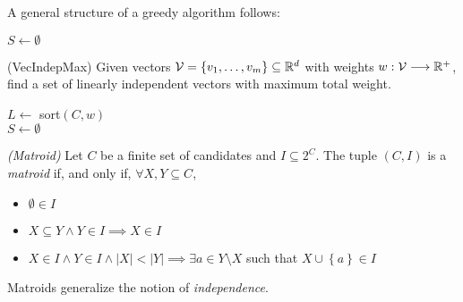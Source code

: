 A general structure of a greedy algorithm follows:
\begin{algorithm}
     $S\gets \emptyset$ \\
\end{algorithm}

\begin{problem}
    (VecIndepMax)
    Given vectors $\mathcal{V}=\left\{ v_1,\ldots,v_m \right\} \subseteq\mathbb{R}^{d}$ with weights $w: \mathcal{V} \longrightarrow \mathbb{R}^{+}$, find a set of linearly independent vectors with maximum total weight.
\end{problem}

\begin{algorithm}
    $L\gets $ sort$(C,w)$ \\
    $S\gets \emptyset$ \\
\end{algorithm}

\begin{definition}
    \emph{(Matroid)} 
    Let $C$ be a finite set of candidates and $I\subseteq 2^{C}$.
    The tuple $(C,I)$ is a \emph{matroid} if, and only if, $\forall X,Y \subseteq C$,
    \begin{itemize}
        \item $\emptyset \in I$ 
	\item $X\subseteq Y \land Y \in I \implies X \in I$
	\item $X\in I \land Y \in I \land |X| < |Y| \implies \exists a \in Y \setminus X $ such that $X\cup \left\{ a \right\} \in I$
    \end{itemize}
\end{definition}

Matroids generalize the notion of \emph{independence}.

